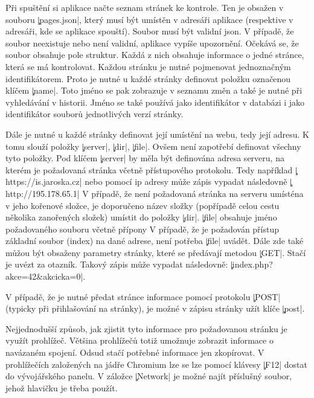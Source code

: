 
Při spuštění si aplikace načte seznam stránek ke kontrole.
Ten je obsažen v souboru \c|pages.json|, který musí být umístěn v adresáři aplikace (respektive v adresáři, kde se aplikace spouští).
Soubor musí být validní json.
V případě, že soubor neexistuje nebo není validní, aplikace vypíše upozornění. %
Očekává se, že soubor obsahuje pole struktur.
Každá z nich obsahuje informace o jedné stránce, která se má kontrolovat.
Každou stránku je nutné pojmenovat jednoznačným identifikátorem.
Proto je nutné u každé stránky definovat položku označenou klíčem \c|name|.
Toto jméno se pak zobrazuje v seznamu změn a také je nutné při vyhledávání v historii.
Jméno se také používá jako identifikátor v databázi i jako identifikátor souborů jednotlivých verzí stránky.

Dále je nutné u každé stránky definovat její umístění na webu, tedy její adresu.
K tomu slouží položky \c|server|, \c|dir|, \c|file|.
Ovšem není zapotřebí definovat všechny tyto položky.
Pod klíčem \c|server| by měla být definována adresa serveru, na kterém je požadovaná stránka včetně přístupového protokolu.
Tedy například \c|https://is.jaroska.cz| nebo pomocí ip adresy může zápis vypadat následovně \c|http://195.178.65.1|
V případě, že není požadovaná stránka na serveru umísténa v jeho kořenové složce, je doporučeno název složky (popřípadě celou cestu několika zanořených složek) umístit do položky \c|dir|.
\c|file| obsahuje jméno požadovaného souboru včetně přípony
V případě, že je požadován přístup základní soubor (index) na dané adrese, není potřeba \c|file| uvádět.
Dále zde také můžou být obsaženy parametry stránky, které se předávají metodou \c|GET|.
Stačí je uvézt za otazník.
Takový zápis může vypadat následovně: \c|index.php?akce=42&akcicka=0|.

V případě, že je nutné předat stránce informace pomocí protokolu \c|POST| (typicky při přihlašování na stránky), 
je možné v zápisu stránky užít klíče \c|post|.

Nejjednodušší způsob, jak zjistit tyto informace pro požadovanou stránku je využít prohlížeč.
Většina prohlížečů totiž umožnuje zobrazit informace o navázaném spojení.
Odsud stačí potřebné informace jen zkopírovat.
V prohlížečích založených na jádře Chromium lze se lze pomocí klávesy \c|F12| dostat do vývojářského panelu.
V záložce \c|Network| je možné najít příslušný soubor, jehož hlavičku je třeba použít.

